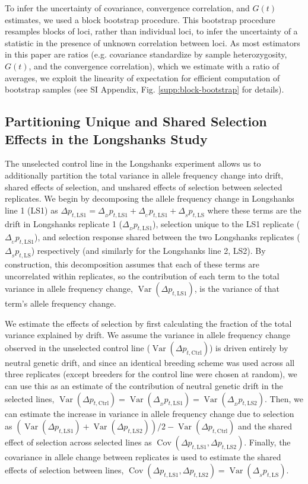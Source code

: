 \documentclass[9pt,twocolumn,twoside]{pnas-new}
\DeclareMathOperator{\var}{Var}
\DeclareMathOperator{\cov}{Cov}
\begin{document}
{To infer the uncertainty of covariance, convergence correlation, and $G(t)$
estimates, we used a block bootstrap procedure. This bootstrap procedure
resamples blocks of loci, rather than individual loci, to infer the
uncertainty of a statistic in the presence of unknown correlation between loci.
As most estimators in this paper are ratios (e.g. covariance standardize by
sample heterozygosity, $G(t)$, and the convergence correlation), which we
estimate with a ratio of averages, we exploit the linearity of expectation for
efficient computation of bootstrap samples (see SI Appendix, Fig.
\ref{supp:block-bootstrap} for details).

\subsection*{Partitioning Unique and Shared Selection Effects in the Longshanks Study}
\label{sec:mm-partition}

The unselected control line in the Longshanks experiment allows us to
additionally partition the total variance in allele frequency change into
drift, shared effects of selection, and unshared effects of selection between
selected replicates. We begin by decomposing the allele frequency change in
Longshanks line 1 (LS1) as $\Delta p_{t,\mathrm{LS1}} = \Delta_{_{D}}
p_{t,\mathrm{LS1}} + \Delta_{_{U}} p_{t,\mathrm{LS1}} + \Delta_{_S}
p_{t,\mathrm{LS}}$ where these terms are the drift in Longshanks replicate 1
($\Delta_{_D} p_{t,\mathrm{LS1}}$), selection unique to the LS1 replicate
($\Delta_{_U} p_{t,\mathrm{LS1}}$), and selection response shared between the
two Longshanks replicates ($\Delta_{_S} p_{t,\mathrm{LS}}$) respectively (and
similarly for the Longshanks line 2, LS2). By construction, this decomposition
assumes that each of these terms are uncorrelated within replicates, so the
contribution of each term to the total variance in allele frequency change,
$\var(\Delta p_{t,\mathrm{LS1}})$, is the variance of that term's allele
frequency change. 

We estimate the effects of selection by first calculating the fraction of the
total variance explained by drift. We assume the variance in allele frequency
change observed in the unselected control line ($\var(\Delta
p_{t,\mathrm{Ctrl}})$) is driven entirely by neutral genetic drift, and since
an identical breeding scheme was used across all three replicates (except
breeders for the control line were chosen at random), we can use this as an
estimate of the contribution of neutral genetic drift in the selected lines,
$\var(\Delta p_{t,\mathrm{Ctrl}}) = \var(\Delta_{_{D}} p_{t,\mathrm{LS1}}) =
\var(\Delta_{_{D}} p_{t,\mathrm{LS2}})$. Then, we can estimate the increase in
variance in allele frequency change due to selection as $(\var(\Delta
p_{t,\mathrm{LS1}}) + \var(\Delta p_{t,\mathrm{LS2}}))/2 - \var(\Delta
p_{t,\mathrm{Ctrl}})$ and the shared effect of selection across selected lines
as $\cov(\Delta p_{t,\mathrm{LS1}}, \Delta p_{t,\mathrm{LS2}})$. Finally, the
covariance in allele change between replicates is used to estimate the shared
effects of selection between lines, $\cov(\Delta p_{t,\mathrm{LS1}}, \Delta
p_{t,\mathrm{LS2}}) = \var(\Delta_{_S} p_{t,\mathrm{LS}})$.

}
\end{document}
